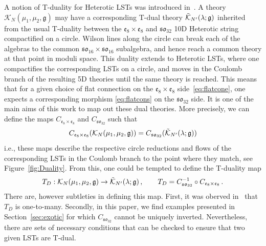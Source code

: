 \documentclass[11pt]{article}
\numberwithin{equation}{section}
\begin{document}
A notion of T-duality for Heterotic LSTs was introduced in~\cite{Intriligator:1997dh}. A theory $\mathcal{K}_{N} (\mu_{1},\mu_{2},\mathfrak{g})$ may have a corresponding T-dual theory $\mathcal{\Tilde{K}}_{N'}(\lambda;\mathfrak{g})$ inherited from the usual T-duality between the $\mathfrak{e}_{8} \times \mathfrak{e_{8}}$ and $\mathfrak{so}_{32}$ 10D Heterotic string compactified on a circle. Wilson lines along the circle can break each of the algebras to the common $\mathfrak{so}_{16} \times \mathfrak{so}_{16}$ subalgebra, and hence reach a common theory at that point in moduli space. This duality extends to Heterotic LSTs, where one compactifies the corresponding LSTs on a circle, and moves in the Coulomb branch of the resulting 5D theories until the same theory is reached. This means that for a given choice of flat connection on the $\mathfrak{e}_{8}\times \mathfrak{e}_{8}$ side~\eqref{eq:flatcone}, one expects a corresponding morphism \eqref{eq:flatcons} on the $\mathfrak{so}_{32}$ side. It is one of the main aims of this work to map out these dual theories. More precisely, we can define the maps $C_{\mathfrak{e}_{8}\times \mathfrak{e}_{8}} $ and $C_{\mathfrak{so}_{32}}$ such that
\begin{align}
C_{\mathfrak{e}_{8}\times \mathfrak{e}_{8}} (\mathcal{K}_{N} (\mu_{1},\mu_{2},\mathfrak{g}))=C_{\mathfrak{so}_{32}}(\mathcal{\Tilde{K}}_{N'}(\lambda;\mathfrak{g}))
\end{align}
i.e., these maps describe the respective circle reductions and flows of the corresponding LSTs in the Coulomb branch to the point where they match, see Figure~\ref{fig:Duality}. From this, one could be tempted to define the T-duality map
\begin{align}
T_{D}: \mathcal{K}_{N} (\mu_{1},\mu_{2},\mathfrak{g}) \rightarrow \mathcal{\Tilde{K}}_{N'}(\lambda;\mathfrak{g})\,,\qquad
T_{D}=C_{\mathfrak{so}_{32}}^{-1}\circ C_{\mathfrak{e}_{8}\times \mathfrak{e}_{8}}\,.
\end{align}
There are, however subtleties in defining this map. First, it was oberved in~\cite{DelZotto:2022xrh} that $T_D$ is one-to-many. Secondly, in this paper, we find examples presented in Section~\ref{sec:exotic} for which $C_{\mathfrak{so}_{32}}$ cannot be uniquely inverted. Nevertheless, there are sets of necessary conditions that can be checked to ensure that two given LSTs are T-dual. 
\end{document}
